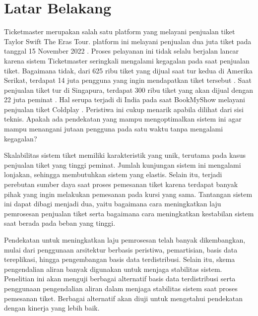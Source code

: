 \section{Latar Belakang}
\label{sec:latar-belakang}

Ticketmaster merupakan salah satu platform yang melayani penjualan tiket Taylor Swift The Eras Tour. platform ini melayani penjualan dua juta tiket pada tanggal 15 November 2022 \parencite{swiftTicketmaster}. Proses pelayanan ini tidak selalu berjalan lancar karena sistem Ticketmaster seringkali mengalami kegagalan pada saat penjualan tiket. Bagaimana tidak, dari 625 ribu tiket yang dijual saat tur kedua di Amerika Serikat, terdapat 14 juta pengguna yang ingin mendapatkan tiket tersebut \parencite{USTaylorSwift}. Saat penjualan tiket tur di Singapura, terdapat 300 ribu tiket yang akan dijual dengan 22 juta peminat \parencite{asiaTaylorSwift}. Hal serupa terjadi di India pada saat BookMyShow melayani penjualan tiket Coldplay \parencite{coldplayBookMyShow}. Peristiwa ini cukup menarik apabila dilihat dari sisi teknis. Apakah ada pendekatan yang mampu mengoptimalkan sistem ini agar mampu menangani jutaan pengguna pada satu waktu tanpa mengalami kegagalan?

Skalabilitas sistem tiket memiliki karakteristik yang unik, terutama pada kasus penjualan tiket yang tinggi peminat. Jumlah kunjungan sistem ini mengalami lonjakan, sehingga membutuhkan sistem yang elastis. Selain itu, terjadi perebutan sumber daya saat proses pemesanan tiket karena terdapat banyak pihak yang ingin melakukan pemesanan pada kursi yang sama. Tantangan sistem ini dapat dibagi menjadi dua, yaitu bagaimana cara meningkatkan laju pemrosesan penjualan tiket serta bagaimana cara meningkatkan kestabilan sistem saat berada pada beban yang tinggi.

Pendekatan untuk meningkatkan laju pemrosesan telah banyak dikembangkan, mulai dari penggunaan arsitektur berbasis peristiwa, pemartisian, basis data tereplikasi, hingga pengembangan basis data terdistribusi. Selain itu, skema pengendalian aliran banyak digunakan untuk menjaga stabilitas sistem. Penelitian ini akan menguji berbagai alternatif basis data terdistribusi serta penggunaan pengendalian aliran dalam menjaga stabilitas sistem saat proses pemesanan tiket. Berbagai alternatif akan diuji untuk mengetahui pendekatan dengan kinerja yang lebih baik.

